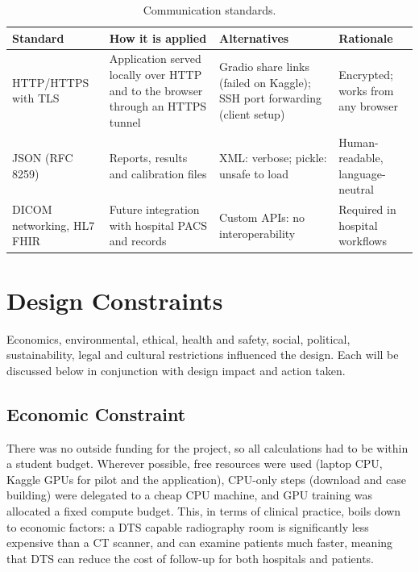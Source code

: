 \begin{table}[!htbp]
\centering\small
\caption{Communication standards.}
\label{tab:commstd}
\begin{tabularx}{\linewidth}{>{\raggedright\arraybackslash}p{3.2cm} >{\raggedright\arraybackslash}X >{\raggedright\arraybackslash}X >{\raggedright\arraybackslash}X}
\toprule
Standard & How it is applied & Alternatives & Rationale \\
\midrule
HTTP/HTTPS with TLS & Application served locally over HTTP and to the browser through an HTTPS tunnel & Gradio share links (failed on Kaggle); SSH port forwarding (client setup) & Encrypted; works from any browser \\
JSON (RFC 8259) & Reports, results and calibration files & XML: verbose; pickle: unsafe to load & Human-readable, language-neutral \\
DICOM networking, HL7 FHIR & Future integration with hospital PACS and records & Custom APIs: no interoperability & Required in hospital workflows \\
\bottomrule
\end{tabularx}
\end{table}

\section{Design Constraints}

Economics, environmental, ethical, health and safety, social, political, sustainability, legal and cultural restrictions influenced the design. Each will be discussed below in conjunction with design impact and action taken.

\subsection{Economic Constraint}

There was no outside funding for the project, so all calculations had to be within a student budget. Wherever possible, free resources were used (laptop CPU, Kaggle GPUs for pilot and the application), CPU-only steps (download and case building) were delegated to a cheap CPU machine, and GPU training was allocated a fixed compute budget. This, in terms of clinical practice, boils down to economic factors: a DTS capable radiography room is significantly less expensive than a CT scanner, and can examine patients much faster, meaning that DTS can reduce the cost of follow-up for both hospitals and patients.


